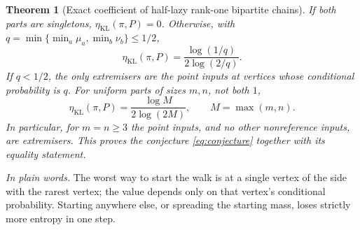 \documentclass[11pt,a4paper]{article}
\numberwithin{equation}{section}
\newtheorem{theorem}{Theorem}[section]
\theoremstyle{definition}
\theoremstyle{remark}
\newcommand{\etaKL}{\eta_{\mathrm{KL}}}
\newcommand{\plain}[1]{\par\smallskip\noindent\textit{In plain words.} #1\par\smallskip}
\begin{document}
\begin{theorem}[Exact coefficient of half-lazy rank-one bipartite chains]\label{thm:bipartite}
If both parts are singletons, \(\etaKL(\pi,P)=0\). Otherwise, with
\(q=\min\{\min_a\mu_a,\min_b\nu_b\}\le1/2\),
\begin{equation}\label{eq:bipartite}
\boxed{\etaKL(\pi,P)=\frac{\log(1/q)}{2\log(2/q)}.}
\end{equation}
If \(q<1/2\), the only extremisers are the point inputs at vertices whose
conditional probability is \(q\). For uniform parts of sizes \(m,n\), not
both \(1\),
\begin{equation}\label{eq:kmn}
\etaKL(\pi,P)=\frac{\log M}{2\log(2M)},\qquad M=\max(m,n).
\end{equation}
In particular, for \(m=n\ge3\) the point inputs, and no other nonreference
inputs, are extremisers. This proves the conjecture \eqref{eq:conjecture}
together with its equality statement.
\end{theorem}
\plain{The worst way to start the walk is at a single vertex of the side with
the rarest vertex; the value depends only on that vertex's conditional
probability. Starting anywhere else, or spreading the starting mass, loses
strictly more entropy in one step.}
\end{document}
